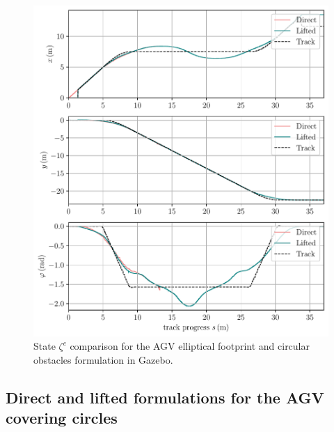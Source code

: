 \begin{figure}[tb]
    \includegraphics[width=1\textwidth]{figures/experiments/zeta_c_2c}
    \caption{State $\zeta^{c}$ comparison for the \ac{AGV} elliptical footprint and circular obstacles formulation in Gazebo.}  \label{fig_comp_zeta_c_2c}
\end{figure}
\newpage
\clearpage

\subsection{Direct and lifted formulations for the AGV covering circles}

